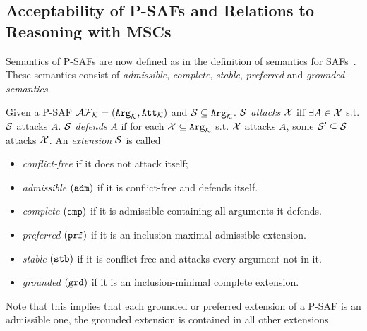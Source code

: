 \subsection{Acceptability of P-SAFs and Relations to Reasoning with MSCs}

Semantics of P-SAFs are now defined as in the definition of semantics for SAFs~\cite{Nielsen2007}. These semantics consist of \textit{admissible}, \textit{complete}, \textit{stable}, \textit{preferred} and \textit{grounded semantics}. 

Given a P-SAF $\mathcal{AF}_{\mathcal{K}} = (\texttt{\textup{Arg}}_{\mathcal{K}}, \texttt{\textup{Att}}_{\mathcal{K}})$ and $\mathcal{S}\subseteq \texttt{\textup{Arg}}_{\mathcal{K}}$. $\mathcal{S}$ \emph{attacks} $\mathcal{X}$ iff $ \exists A \in \mathcal{X}$ s.t. $\mathcal{S}$ attacks $A$.  $\mathcal{S}$ \emph{defends} $A$ if for each $\mathcal{X} \subseteq \texttt{\textup{Arg}}_{\mathcal{K}}$ s.t. $\mathcal{X}$ attacks $A$, some $\mathcal{S}^{\prime} \subseteq \mathcal{S}$ attacks $\mathcal{X}$. An \textit{extension} $\mathcal{S}$ is called

\begin{itemize}

    \item \emph{conflict-free} if it does not attack itself;

    \item \emph{admissible} $(\texttt{\textup{adm}})$ if it is conflict-free and defends itself.

    \item \emph{complete} $(\texttt{\textup{cmp}})$  if it is  admissible containing all arguments  it defends.

    \item \emph{preferred} $(\texttt{\textup{prf}})$ if it is an inclusion-maximal admissible extension. %

    \item \emph{stable} $(\texttt{\textup{stb}})$ if it is conflict-free and attacks every argument not in it.

    \item \emph{grounded} $(\texttt{\textup{grd}})$ if it is an inclusion-minimal complete extension.%
    
\end{itemize}
Note that this implies that each grounded or preferred extension of a P-SAF is an admissible one, the grounded extension is contained in all other extensions.

